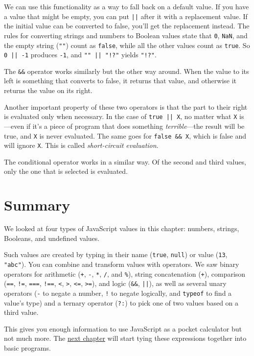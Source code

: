 We can use this functionality as a way to fall back on a default value. If you have a value that might be empty, you can put \lstinline`||` after it with a replacement value. If the initial value can be converted to false, you'll get the replacement instead. The rules for converting strings and numbers to Boolean values state that \lstinline`0`, \lstinline`NaN`, and the empty string (\lstinline`""`) count as \lstinline`false`, while all the other values count as \lstinline`true`. So \lstinline`0 || -1` produces \lstinline`-1`, and \lstinline`"" || "!?"` yields \lstinline`"!?"`.

The \lstinline`&&` operator works similarly but the other way around. When the value to its left is something that converts to false, it returns that value, and otherwise it returns the value on its right.

Another important property of these two operators is that the part to their right is evaluated only when necessary. In the case of \lstinline`true || X`, no matter what \lstinline`X` is—even if it's a piece of program that does something \emph{terrible}—the result will be true, and \lstinline`X` is never evaluated. The same goes for \lstinline`false && X`, which is false and will ignore \lstinline`X`. This is called \emph{short-circuit evaluation}.

The conditional operator works in a similar way. Of the second and third values, only the one that is selected is evaluated.

\section{Summary}

We looked at four types of JavaScript values in this chapter: numbers, strings, Booleans, and undefined values.

Such values are created by typing in their name (\lstinline`true`, \lstinline`null`) or value (\lstinline`13`, \lstinline`"abc"`). You can combine and transform values with operators. We saw binary operators for arithmetic (\lstinline`+`, \lstinline`-`, \lstinline`*`, \lstinline`/`, and \lstinline`%`), string concatenation (\lstinline`+`), comparison (\lstinline`==`, \lstinline`!=`, \lstinline`===`, \lstinline`!==`, \lstinline`<`, \lstinline`>`, \lstinline`<=`, \lstinline`>=`), and logic (\lstinline`&&`, \lstinline`||`), as well as several unary operators (\lstinline`-` to negate a number, \lstinline`!` to negate logically, and \lstinline`typeof` to find a value's type) and a ternary operator (\lstinline`?:`) to pick one of two values based on a third value.

This gives you enough information to use JavaScript as a pocket calculator but not much more. The \hyperref[program_structure]{next chapter} will start tying these expressions together into basic programs.
